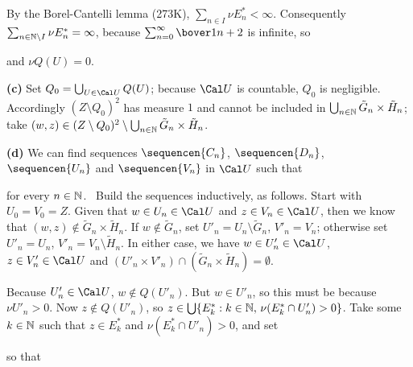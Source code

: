 {

\noindent By the
Borel-Cantelli lemma (273K), $\sum_{n\in I}\nu E_n^*<\infty$.
Consequently
$\sum_{n\in\Bbb N\setminus I}\nu E_n^*=\infty$, because $\sum_{n=0}^{\infty}\bover1{n+2}$ is infinite, so


\noindent and $\nu Q(U)=0$.\ \Qed

\medskip

{\bf (c)} Set $Q_0=\bigcup_{U\in\Cal U}Q(U)$;  because $\Cal U$ is
countable, $Q_0$ is negligible.   Accordingly $(Z\setminus Q_0)^2$ has
measure $1$ and cannot be included in $\bigcup_{n\in\Bbb N}\tilde
G_n\times
\tilde H_n$;  take $(w,z)\in(Z\setminus Q_0)^2\setminus\bigcup_{n\in\Bbb
N}\tilde G_n\times \tilde H_n$.

\medskip

{\bf (d)} We can find sequences $\sequencen{C_n}$, $\sequencen{D_n}$,
$\sequencen{U_n}$ and $\sequencen{V_n}$ in $\Cal U$ such that





\noindent for every $n\in\Bbb N$.   \Prf\ Build the sequences
inductively, as follows.   Start with $U_0=V_0=Z$.   Given that
$w\in U_n\in\Cal U$ and $z\in V_n\in\Cal U$,
then we know that $(w,z)\notin
\tilde G_n\times \tilde H_n$.   If $w\notin \tilde G_n$, set
$U'_n=U_n\setminus \tilde G_n$,
$V'_n=V_n$;  otherwise set $U'_n=U_n$, $V'_n=V_n\setminus \tilde H_n$.
In
either case, we have $w\in U'_n\in\Cal U$, $z\in V'_n\in\Cal U$ and
$(U'_n\times V'_n)\cap(\tilde G_n\times \tilde H_n)=\emptyset$.

Because $U'_n\in\Cal U$, $w\notin Q(U'_n)$.   But $w\in U'_n$, so this
must be because $\nu U'_n>0$.    Now $z\notin Q(U'_n)$, so
$z\in\bigcup\{E^*_k:k\in\Bbb N,\,\nu(E^*_k\cap U'_n)>0\}$.   Take
some $k\in\Bbb N$ such that $z\in E^*_k$ and $\nu(E^*_k\cap
U'_n)>0$, and set


\noindent so that

}
